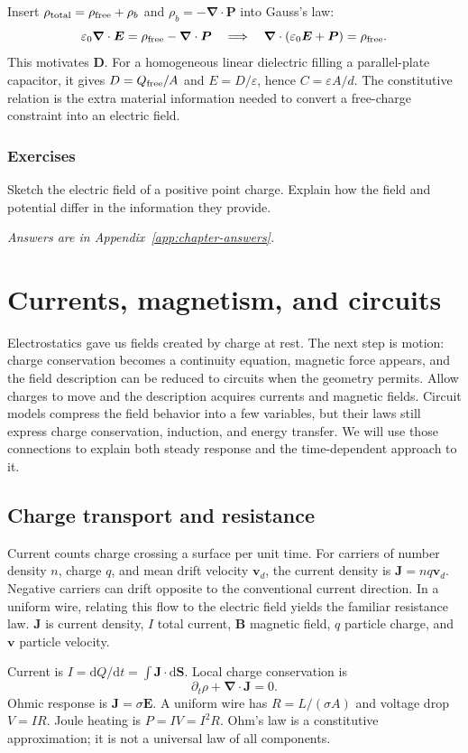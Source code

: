 \documentclass[11pt,oneside]{book}
\newcommand{\dd}{\mathrm{d}}
\newcommand{\vect}[1]{\boldsymbol{#1}}
\newcommand{\grad}{\boldsymbol{\nabla}}
\newcommand{\eps}{\varepsilon_0}
\theoremstyle{reviewstyle}
\newcommand{\learningcheck}[1]{\subsection*{Exercises}\noindent #1\par\smallskip\noindent\emph{Answers are in Appendix~\ref{app:chapter-answers}.}}
\begin{document}
Insert $\rho_{\rm total}=\rho_{\rm free}+\rho_b$ and $\rho_b=-\grad\cdot\vect P$ into Gauss's law:
\begin{equation}
\eps\grad\cdot\vect E=\rho_{\rm free}-\grad\cdot\vect P
\quad\Longrightarrow\quad
\grad\cdot(\eps\vect E+\vect P)=\rho_{\rm free}.
\end{equation}
This motivates $\vect D$. For a homogeneous linear dielectric filling a parallel-plate capacitor, it gives $D=Q_{\rm free}/A$ and $E=D/\varepsilon$, hence $C=\varepsilon A/d$. The constitutive relation is the extra material information needed to convert a free-charge constraint into an electric field.

\learningcheck{Sketch the electric field of a positive point charge. Explain how the field and potential differ in the information they provide.}

\chapter{Currents, magnetism, and circuits}
Electrostatics gave us fields created by charge at rest. The next step is motion: charge conservation becomes a continuity equation, magnetic force appears, and the field description can be reduced to circuits when the geometry permits.
Allow charges to move and the description acquires currents and magnetic fields. Circuit models compress the field behavior into a few variables, but their laws still express charge conservation, induction, and energy transfer. We will use those connections to explain both steady response and the time-dependent approach to it.

\section{Charge transport and resistance}
Current counts charge crossing a surface per unit time. For carriers of number density $n$, charge $q$, and mean drift velocity $\vect v_d$, the current density is $\vect J=nq\vect v_d$. Negative carriers can drift opposite to the conventional current direction. In a uniform wire, relating this flow to the electric field yields the familiar resistance law. $\vect J$ is current density, $I$ total current, $\vect B$ magnetic field, $q$ particle charge, and $\vect v$ particle velocity.

Current is $I=\dd Q/\dd t=\int\vect J\cdot\dd\vect S$. Local charge conservation is
\begin{equation}\partial_t\rho+\grad\cdot\vect J=0.\end{equation}
Ohmic response is $\vect J=\sigma\vect E$. A uniform wire has $R=L/(\sigma A)$ and voltage drop $V=IR$. Joule heating is $P=IV=I^2R$. Ohm's law is a constitutive approximation; it is not a universal law of all components.
\end{document}
